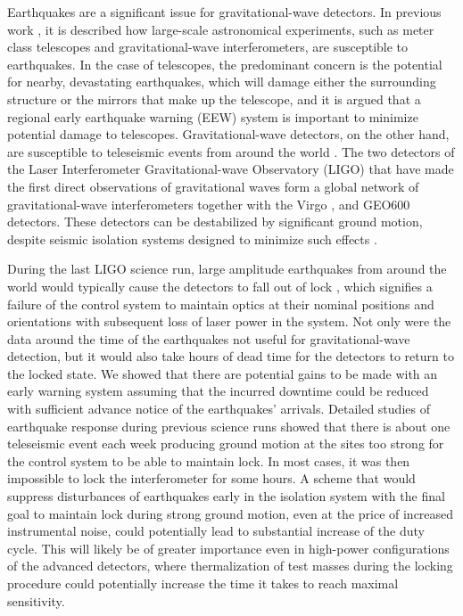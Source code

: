\documentclass[twocolumn, aps, superscriptaddress]{revtex4}
\begin{document}
Earthquakes are a significant issue for gravitational-wave detectors. In previous work \cite{CoSt2015}, it is described how large-scale astronomical experiments, such as meter class telescopes and gravitational-wave interferometers, are susceptible to earthquakes. In the case of telescopes, the predominant concern is the potential for nearby, devastating earthquakes, which will damage either the surrounding structure or the mirrors that make up the telescope, and it is argued that a regional early earthquake warning (EEW) \cite{Al2012,KuAl2013a,KuAl2013b,KuHe2014,CoLa2009a,CoLa2009b,BoAl2014,HoKa2008,HoEA2011c,StAl2016} system is important to minimize potential damage to telescopes. 
Gravitational-wave detectors, on the other hand, are susceptible to teleseismic events from around the world \cite{MaFa2012}. 
The two detectors of the Laser Interferometer Gravitational-wave Observatory (LIGO) \cite{aligo} that have made the first direct observations of gravitational waves \cite{AbEA2016a,AbEA2016e} form a global network of gravitational-wave interferometers together with the Virgo \cite{avirgo}, and GEO600 \cite{Gr2010} detectors. These detectors can be destabilized by significant ground motion, despite seismic isolation systems designed to minimize such effects \cite{AbAd2002,StAb2009,MaLa2015}.

During the last LIGO science run, large amplitude earthquakes from around the world would typically cause the detectors to fall out of lock \cite{CoSt2015}, which signifies a failure of the control system to maintain optics at their nominal positions and orientations with subsequent loss of laser power in the system. Not only were the data around the time of the earthquakes not useful for gravitational-wave detection, but it would also take hours of dead time for the detectors to return to the locked state. 
We showed that there are potential gains to be made with an early warning system assuming that the incurred downtime could be reduced with sufficient advance notice of the earthquakes' arrivals.
Detailed studies of earthquake response during previous science runs showed that there is about one teleseismic event each week producing ground motion at the sites too strong for the control system to be able to maintain lock. In most cases, it was then impossible to lock the interferometer for some hours. A scheme that would suppress disturbances of earthquakes early in the isolation system with the final goal to maintain lock during strong ground motion, even at the price of increased instrumental noise, could potentially lead to substantial increase of the duty cycle. This will likely be of greater importance even in high-power configurations of the advanced detectors, where thermalization of test masses during the locking procedure could potentially increase the time it takes to reach maximal sensitivity.
\end{document}
